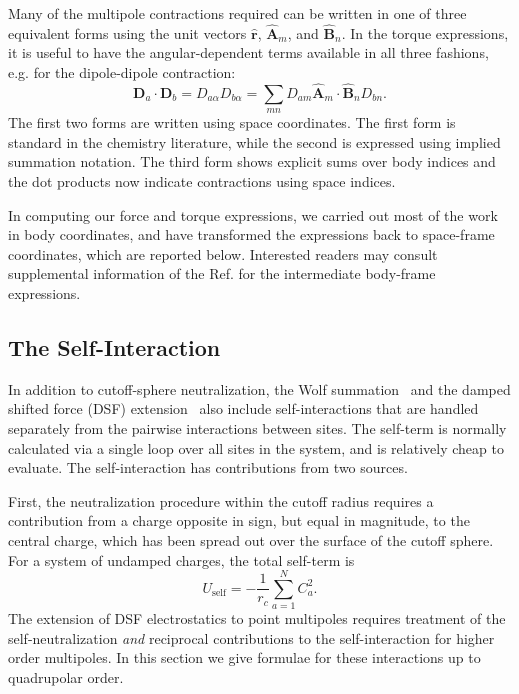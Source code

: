Many of the multipole contractions required can be written in one of
three equivalent forms using the unit vectors $\hat{\mathbf{r}}$, $\hat{\mathbf{A}}_m$,
and $\hat{\mathbf{B}}_n$. In the torque expressions, it is useful to have the
angular-dependent terms available in all three fashions, e.g. for the
dipole-dipole contraction:
%
\begin{equation}
 \mathbf{D}_a \cdot \mathbf{D}_b
= D_{a \alpha} D_{b \alpha} =
\sum_{mn} D_{am} \hat{\mathbf{A}}_m \cdot \hat{\mathbf{B}}_n D_{bn}.
\end{equation}
%
The first two forms are written using space coordinates.  The first
form is standard in the chemistry literature, while the second is
expressed using implied summation notation.  The third form shows
explicit sums over body indices and the dot products now indicate
contractions using space indices. 

In computing our force and torque expressions, we carried out most of
the work in body coordinates, and have transformed the expressions
back to space-frame coordinates, which are reported below.  Interested
readers may consult supplemental information of the Ref. \cite{PaperI} for the intermediate body-frame expressions.

\subsection{The Self-Interaction \label{sec:selfTerm}}

In addition to cutoff-sphere neutralization, the Wolf
summation~\cite{Wolf99} and the damped shifted force (DSF)
extension~\cite{Gezelter06} also include self-interactions that
are handled separately from the pairwise interactions between
sites. The self-term is normally calculated via a single loop over all
sites in the system, and is relatively cheap to evaluate. The
self-interaction has contributions from two sources.

First, the neutralization procedure within the cutoff radius requires
a contribution from a charge opposite in sign, but equal in magnitude,
to the central charge, which has been spread out over the surface of
the cutoff sphere.  For a system of undamped charges, the total
self-term is
\begin{equation}
U_\textrm{self} = - \frac{1}{r_c} \sum_{a=1}^N C_a^{2}.
\label{eq:selfTerm}
\end{equation}
The extension of DSF electrostatics to point multipoles requires
treatment of the self-neutralization \textit{and} reciprocal
contributions to the self-interaction for higher order multipoles.  In
this section we give formulae for these interactions up to quadrupolar
order.

